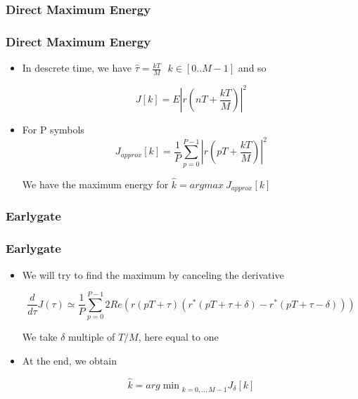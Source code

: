 \documentclass[11pt]{beamer}
\begin{document}
\subsubsection{Direct Maximum Energy}
\begin{frame}
\frametitle{Direct Maximum Energy}

\begin{itemize}

\item In descrete time, we have $\hat{\tau} = \frac{kT}{M} \ \ \ k \in  [0..M-1]$ and so
		
\begin{equation} 
J[k] = E|r(nT+\frac{kT}{M})|^2
\end{equation}

\item For P symbols
\begin{equation}
J_{approx}[k] = \frac{1}{P} \sum \limits_{p=0}^{P-1} |r(pT+\frac{kT}{M})|^2
\label{equ1}
\end{equation}

We have the maximum energy for $\hat{k}=argmax\ J_{approx}[k]$


\end{itemize}

\end{frame}

\subsubsection{Earlygate}

\begin{frame}
\frametitle{Earlygate}

\begin{itemize}

\item We will try to find the maximum by canceling the derivative

\begin{equation}
\frac{d}{d\tau} J(\tau)  \simeq \frac{1}{P} \sum_{p=0}^{P-1} 2Re(r(pT+\tau)(r^*(pT+\tau+\delta)-r^*(pT+\tau-\delta)))
\end{equation}

We take $\delta$ multiple of $T/M$, here equal to one

\item At the end, we obtain  

\begin{equation}
\hat{k}= {arg\min}_{k=0,..,M-1} J_{\delta}[k]
\end{equation}

\end{itemize}

\end{frame}
\end{document}
